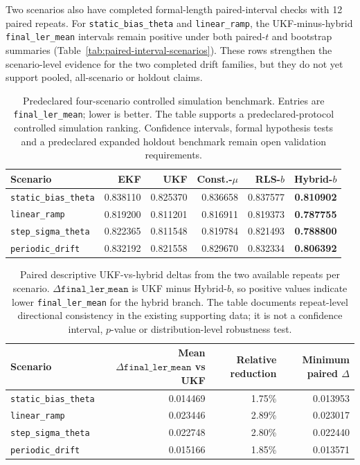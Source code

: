 \documentclass[11pt]{article}
\newcommand{\softwarehil}{controlled simulation}
\newcommand{\finalLER}{\texttt{final\_ler\_mean}}
\begin{document}
Two scenarios also have completed formal-length paired-interval checks with
12 paired repeats.  For \texttt{static\_bias\_theta} and
\texttt{linear\_ramp}, the UKF-minus-hybrid \finalLER{} intervals remain
positive under both paired-\(t\) and bootstrap summaries
(Table~\ref{tab:paired-interval-scenarios}).  These rows strengthen the
scenario-level evidence for the two completed drift families, but they do not
yet support pooled, all-scenario or holdout claims.

\begin{table}[t]
\centering
\small
\begin{tabular}{@{}lrrrrr@{}}
\toprule
Scenario & EKF & UKF & Const.-\(\mu\) & RLS-\(b\) & Hybrid-\(b\) \\
\midrule
\texttt{static\_bias\_theta} & 0.838110 & 0.825370 & 0.836658 & 0.837577 & \textbf{0.810902} \\
\texttt{linear\_ramp} & 0.819200 & 0.811201 & 0.816911 & 0.819373 & \textbf{0.787755} \\
\texttt{step\_sigma\_theta} & 0.822365 & 0.811548 & 0.819784 & 0.821493 & \textbf{0.788800} \\
\texttt{periodic\_drift} & 0.832192 & 0.821558 & 0.829670 & 0.832334 & \textbf{0.806392} \\
\bottomrule
\end{tabular}
\caption{Predeclared four-scenario \softwarehil{} benchmark.  Entries are
\finalLER{}; lower is better.  The table supports a predeclared-protocol
\softwarehil{} ranking.  Confidence intervals, formal hypothesis tests and a
predeclared expanded holdout benchmark remain open validation requirements.}
\label{tab:main-results}
\end{table}

\begin{table}[t]
\centering
\small
\begin{tabular}{@{}lrrr@{}}
\toprule
Scenario & Mean \(\Delta\finalLER{}\) vs UKF & Relative reduction & Minimum paired \(\Delta\) \\
\midrule
\texttt{static\_bias\_theta} & 0.014469 & 1.75\% & 0.013953 \\
\texttt{linear\_ramp} & 0.023446 & 2.89\% & 0.023017 \\
\texttt{step\_sigma\_theta} & 0.022748 & 2.80\% & 0.022440 \\
\texttt{periodic\_drift} & 0.015166 & 1.85\% & 0.013571 \\
\bottomrule
\end{tabular}
\caption{Paired descriptive UKF-vs-hybrid deltas from the two available repeats
per scenario.  \(\Delta\finalLER{}\) is UKF minus Hybrid-\(b\), so positive
values indicate lower \finalLER{} for the hybrid branch.  The table documents
repeat-level directional consistency in the existing supporting data; it is not a
confidence interval, \(p\)-value or distribution-level robustness test.}
\label{tab:paired-deltas}
\end{table}
\end{document}
